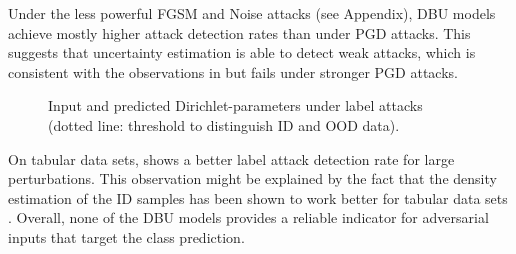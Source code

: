 Under the less powerful FGSM and Noise attacks (see Appendix), DBU models achieve mostly higher attack detection rates than under PGD attacks. This suggests that uncertainty estimation is able to detect weak attacks, which is consistent with the observations in \citep{malinin2018_adetect} but fails under stronger PGD attacks. 
%
\begin{figure}[ht]
	\centering
	\caption{Input and predicted Dirichlet-parameters under label attacks (dotted line: threshold to distinguish ID and OOD data). %
	}
	\label{fig:attaked_samples_labels}
\end{figure}


On tabular data sets, \PostNet shows a better label attack detection rate for large perturbations. This observation might be explained by the fact that the density estimation of the ID samples has been shown to work better for tabular data sets \citep{charpentier2020}. 
%
Overall, none of the DBU models provides a reliable indicator for adversarial inputs that target the class prediction. 





